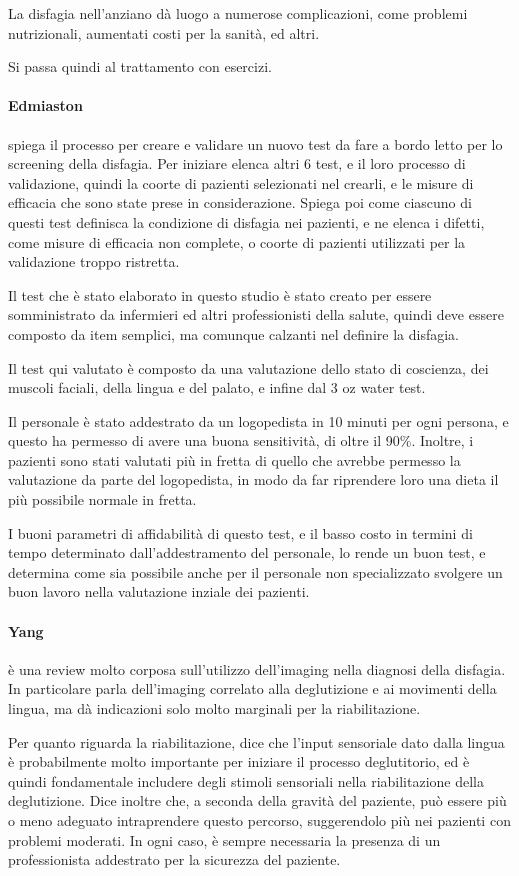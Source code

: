 La disfagia nell'anziano dà luogo a numerose complicazioni, come problemi 
nutrizionali, aumentati costi per la sanità, ed altri.

Si passa quindi al trattamento con esercizi.

\paragraph{Edmiaston} \label{par:edm} \cite{Edmiaston2009} spiega il processo 
per creare e validare un nuovo test da fare a bordo letto per lo screening 
della disfagia.
Per iniziare elenca altri 6 test, e il loro processo di validazione, quindi la 
coorte di pazienti selezionati nel crearli, e le misure di efficacia che sono 
state prese in considerazione.
Spiega poi come ciascuno di questi test definisca la condizione di disfagia nei 
pazienti, e ne elenca i difetti, come misure di efficacia non complete, o 
coorte di pazienti utilizzati per la validazione troppo ristretta.

Il test che è stato elaborato in questo studio è stato creato per essere 
somministrato da infermieri ed altri professionisti della salute, quindi deve 
essere composto da item semplici, ma comunque calzanti nel definire la 
disfagia. 

Il test qui valutato è composto da una valutazione dello stato di coscienza, 
dei muscoli faciali, della lingua e del palato, e infine dal 3 oz water test.

Il personale è stato addestrato da un logopedista in 10 minuti per ogni 
persona, e questo ha permesso di avere una buona sensitività, di oltre il 90\%.
Inoltre, i pazienti sono stati valutati più in fretta di quello che avrebbe 
permesso la valutazione da parte del logopedista, in modo da far riprendere 
loro una dieta il più possibile normale in fretta.

I buoni parametri di affidabilità di questo test, e il basso costo in termini 
di tempo determinato dall'addestramento del personale, lo rende un buon test, e 
determina come sia possibile anche per il personale non specializzato svolgere 
un buon lavoro nella valutazione inziale dei pazienti.

\paragraph{Yang} \label{par:yan} \cite{Yang2016} è una review molto corposa 
sull'utilizzo dell'imaging nella diagnosi della disfagia.
In particolare parla dell'imaging correlato alla deglutizione e ai movimenti 
della lingua, ma dà indicazioni solo molto marginali per la riabilitazione.

Per quanto riguarda la riabilitazione, dice che l'input sensoriale dato dalla 
lingua è probabilmente molto importante per iniziare il processo deglutitorio, 
ed è quindi fondamentale includere degli stimoli sensoriali nella 
riabilitazione della deglutizione.
Dice inoltre che, a seconda della gravità del paziente, può essere più o meno 
adeguato intraprendere questo percorso, suggerendolo più nei pazienti con 
problemi moderati.
In ogni caso, è sempre necessaria la presenza di un professionista addestrato 
per la sicurezza del paziente.
